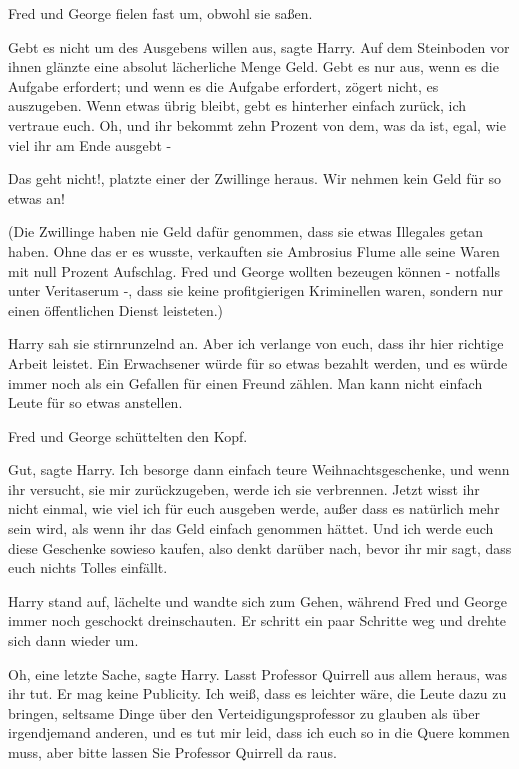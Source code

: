 Fred und George fielen fast um, obwohl sie saßen.

\glqq Gebt es nicht um des Ausgebens willen aus\grqq{}, sagte Harry. Auf dem
Steinboden vor ihnen glänzte eine absolut lächerliche Menge Geld. \glqq Gebt es
nur aus, wenn es die Aufgabe erfordert; und wenn es die Aufgabe erfordert,
zögert nicht, es auszugeben. Wenn etwas übrig bleibt, gebt es hinterher einfach
zurück, ich vertraue euch. Oh, und ihr bekommt zehn Prozent von dem, was da ist,
egal, wie viel ihr am Ende ausgebt -\grqq{}

\glqq Das geht nicht!\grqq{}, platzte einer der Zwillinge heraus. \glqq Wir
nehmen kein Geld für so etwas an!\grqq{}

(Die Zwillinge haben nie Geld dafür genommen, dass sie etwas Illegales getan
haben. Ohne das er es wusste, verkauften sie Ambrosius Flume alle seine Waren
mit null Prozent Aufschlag. Fred und George wollten bezeugen können - notfalls
unter Veritaserum -, dass sie keine profitgierigen Kriminellen waren, sondern
nur einen öffentlichen Dienst leisteten.)

Harry sah sie stirnrunzelnd an. \glqq Aber ich verlange von euch, dass ihr hier
richtige Arbeit leistet. Ein Erwachsener würde für so etwas bezahlt werden, und
es würde immer noch als ein Gefallen für einen Freund zählen. Man kann nicht
einfach Leute für so etwas anstellen.\grqq{}

Fred und George schüttelten den Kopf.

\glqq Gut\grqq{}, sagte Harry. \glqq Ich besorge dann einfach teure
Weihnachtsgeschenke, und wenn ihr versucht, sie mir zurückzugeben, werde ich sie
verbrennen. Jetzt wisst ihr nicht einmal, wie viel ich für euch ausgeben werde,
außer dass es natürlich mehr sein wird, als wenn ihr das Geld einfach genommen
hättet. Und ich werde euch diese Geschenke sowieso kaufen, also denkt darüber
nach, bevor ihr mir sagt, dass euch nichts Tolles einfällt.\grqq{}

Harry stand auf, lächelte und wandte sich zum Gehen, während Fred und George
immer noch geschockt dreinschauten. Er schritt ein paar Schritte weg und drehte
sich dann wieder um.

\glqq Oh, eine letzte Sache\grqq{}, sagte Harry. \glqq Lasst Professor Quirrell
aus allem heraus, was ihr tut. Er mag keine Publicity. Ich weiß, dass es
leichter wäre, die Leute dazu zu bringen, seltsame Dinge über den
Verteidigungsprofessor zu glauben als über irgendjemand anderen, und es tut mir
leid, dass ich euch so in die Quere kommen muss, aber bitte lassen Sie Professor
Quirrell da raus.\grqq{}

